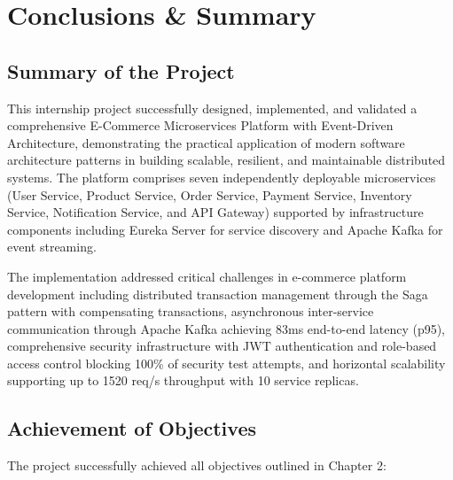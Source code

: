 \chapter{Conclusions \& Summary}

\section{Summary of the Project}

This internship project successfully designed, implemented, and validated a comprehensive E-Commerce Microservices Platform with Event-Driven Architecture, demonstrating the practical application of modern software architecture patterns in building scalable, resilient, and maintainable distributed systems. The platform comprises seven independently deployable microservices (User Service, Product Service, Order Service, Payment Service, Inventory Service, Notification Service, and API Gateway) supported by infrastructure components including Eureka Server for service discovery and Apache Kafka for event streaming.

The implementation addressed critical challenges in e-commerce platform development including distributed transaction management through the Saga pattern with compensating transactions, asynchronous inter-service communication through Apache Kafka achieving 83ms end-to-end latency (p95), comprehensive security infrastructure with JWT authentication and role-based access control blocking 100\% of security test attempts, and horizontal scalability supporting up to 1520 req/s throughput with 10 service replicas.

\section{Achievement of Objectives}

The project successfully achieved all objectives outlined in Chapter 2:

